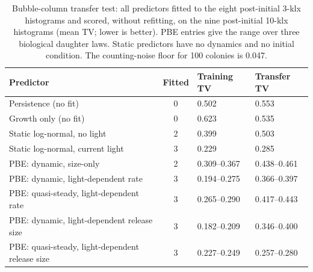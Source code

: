 \begin{table}[t]
\centering\small
\caption{Bubble-column transfer test: all predictors fitted to the eight post-initial 3-klx histograms and scored, without refitting, on the nine post-initial 10-klx histograms (mean TV; lower is better). PBE entries give the range over three biological daughter laws. Static predictors have no dynamics and no initial condition. The counting-noise floor for 100 colonies is 0.047.}
\label{tab:models}
\footnotesize\setlength{\tabcolsep}{4pt}
\begin{tabular}{lcll}
\toprule
Predictor & Fitted & Training TV & Transfer TV \\
\midrule
Persistence (no fit) & 0 & 0.502 & 0.553 \\
Growth only (no fit) & 0 & 0.623 & 0.535 \\
Static log-normal, no light & 2 & 0.399 & 0.503 \\
Static log-normal, current light & 3 & 0.229 & 0.285 \\
\midrule
PBE: dynamic, size-only & 2 & 0.309--0.367 & 0.438--0.461 \\
PBE: dynamic, light-dependent rate & 3 & 0.194--0.275 & 0.366--0.397 \\
PBE: quasi-steady, light-dependent rate & 3 & 0.265--0.290 & 0.417--0.443 \\
PBE: dynamic, light-dependent release size & 3 & 0.182--0.209 & 0.346--0.400 \\
PBE: quasi-steady, light-dependent release size & 3 & 0.227--0.249 & 0.257--0.280 \\
\bottomrule
\end{tabular}
\end{table}
